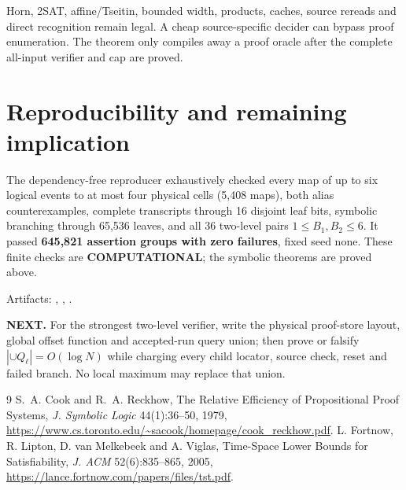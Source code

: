 \documentclass[11pt]{article}
\begin{document}
Horn, 2SAT, affine/Tseitin, bounded width, products, caches, source rereads
and direct recognition remain legal. A cheap source-specific decider can
bypass proof enumeration. The theorem only compiles away a proof oracle
after the complete all-input verifier and cap are proved.

\section{Reproducibility and remaining implication}
The dependency-free reproducer exhaustively checked every map of up to six
logical events to at most four physical cells (5,408 maps), both alias
counterexamples, complete transcripts through 16 disjoint leaf bits,
symbolic branching through 65,536 leaves, and all 36 two-level pairs
$1\le B_1,B_2\le6$. It passed \textbf{645,821 assertion groups with zero
failures}, fixed seed none. These finite checks are \textbf{COMPUTATIONAL};
the symbolic theorems are proved above.

\noindent Artifacts:
,
,
.

\textbf{NEXT.} For the strongest two-level verifier, write the physical
proof-store layout, global offset function and accepted-run query union;
then prove or falsify $|\cup Q_\ell|=O(\log N)$ while charging every child
locator, source check, reset and failed branch. No local maximum may replace
that union.

\begin{thebibliography}{9}
 S.~A. Cook and R.~A. Reckhow,
{The Relative Efficiency of Propositional Proof Systems},
\emph{J. Symbolic Logic} 44(1):36--50, 1979,
\url{https://www.cs.toronto.edu/~sacook/homepage/cook_reckhow.pdf}.
 L. Fortnow, R. Lipton, D. van Melkebeek and A. Viglas,
{Time-Space Lower Bounds for Satisfiability},
\emph{J. ACM} 52(6):835--865, 2005,
\url{https://lance.fortnow.com/papers/files/tst.pdf}.
\end{thebibliography}
\end{document}
